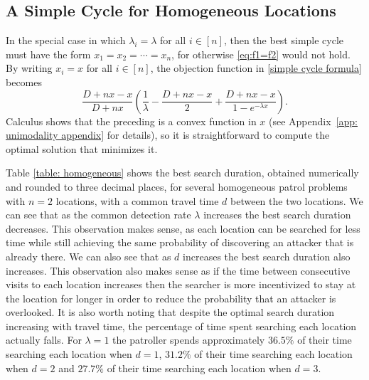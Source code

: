 \documentclass[11pt,a4paper]{article}
\newcommand{\kyle}[1]{{\color{orange}#1}}
\begin{document}

\subsection{A Simple Cycle for Homogeneous Locations} \label{sec: a simple cycle for homogeneous locations}
In the special case in which $\lambda_i = \lambda$ for all $i \in [n]$, then the best simple cycle must have the form $x_1 = x_2 = \cdots = x_n$, for otherwise \eqref{eq:f1=f2} would not hold.
By writing $x_i = x$ for all $i \in [n]$, the objection function in \eqref{simple cycle formula} becomes
\begin{equation} \label{eqn: homogeneous simple cycle}
    \frac{D + nx-x}{D + nx} \left( \frac{1}{\lambda} - \frac{D + nx-x}{2} + \frac{D + nx-x}{1-e^{-\lambda x}} \right).
\end{equation}
Calculus shows that the preceding is a convex function in $x$ (see Appendix~\ref{app: unimodality appendix} for details), so it is straightforward to compute the optimal solution that minimizes it.


Table \ref{table: homogeneous} shows the best search duration, obtained numerically and rounded to three decimal places, for several homogeneous  patrol problems with $n=2$ locations, with a common travel time $d$ between the two locations.
We can see that as the common detection rate $\lambda$ increases the best search duration decreases.
This observation makes sense, as each location can be searched for less time while still achieving the same probability of discovering an attacker that is already there.
We can also see that as $d$ increases the best search duration also increases.
This observation also makes sense as if the time between consecutive visits to each location increases then the searcher is more incentivized to stay at the location for longer in order to reduce the probability that an attacker is overlooked.
It is also worth noting that despite the optimal search duration increasing with travel time, the percentage of time spent searching each location actually falls.
For $\lambda = 1$ the patroller spends approximately $36.5\%$ of their time searching each location when $d = 1$, $31.2\%$ of their time searching each location when $d=2$ and $27.7\%$ of their time searching each location when $d=3$.
\end{document}
